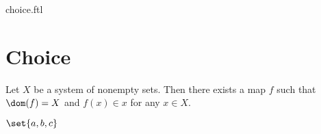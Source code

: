 \documentclass{naproche-library}
\begin{document}
\begin{smodule}{choice.ftl}

  \section{Choice}

  \begin{axiom}[forthel,title=Axiom of Choice,id=FOUNDATIONS_10_1897613305577472,printid]
    Let $X$ be a system of nonempty sets.
    Then there exists a map $f$ such that $\dom(f) = X$ and $f(x) \in x$ for any $x \in X$.
  \end{axiom}

  $\set{a,b,c}$
\end{smodule}
\end{document}
